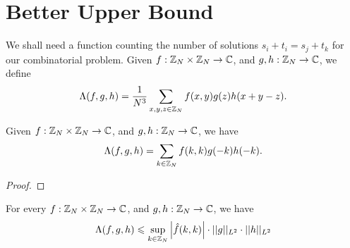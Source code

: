 \section{Better Upper Bound}
We shall need a function counting the number of solutions $ s_i +t_i = s_j + t_k $ for our combinatorial problem. Given $ f : {\mathbb Z}_N \times {\mathbb Z}_N \rightarrow {\mathbb C} $, and $ g, h : {\mathbb Z}_N \rightarrow {\mathbb C} $, we define
$$ \Lambda(f,g,h) = \frac{1}{N^3} \sum\limits_{x,y,z \in {\mathbb Z}_N} f(x,y) g(z) h(x+y-z) .$$

\begin{lemma}
	Given $ f : {\mathbb Z}_N \times {\mathbb Z}_N \rightarrow {\mathbb C} $, and $ g, h : {\mathbb Z}_N \rightarrow {\mathbb C} $, we have
	$$ \Lambda(f,g,h) = \sum\limits_{k \in {\mathbb Z}_N} f(k,k) g(-k) h(-k) .$$
\end{lemma}
\begin{proof}
\end{proof}

\begin{lemma} \label{L2-ineq}
	For every $ f : {\mathbb Z}_N \times {\mathbb Z}_N \rightarrow {\mathbb C} $, and $ g, h : {\mathbb Z}_N \rightarrow {\mathbb C} $, we have
	$$ \Lambda(f,g,h) \leqslant \sup_{k \in {\mathbb Z}_N} \left\vert{\hat{f}(k,k)}\right\vert \cdot ||g||_{L^2} \cdot ||h||_{L^2} $$
\end{lemma} 